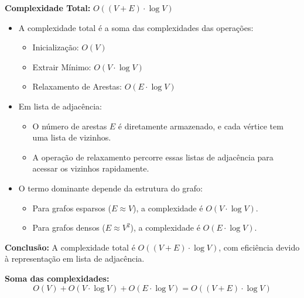 \documentclass[preview]{standalone}
\begin{document}
\begin{center}
\textbf{Complexidade Total:} $O((V + E) \cdot \log V)$
            \begin{itemize}
                \item A complexidade total é a soma das complexidades das operações:
                    \begin{itemize}
                        \item Inicialização: $O(V)$
                        \item Extrair Mínimo: $O(V \cdot \log V)$
                        \item Relaxamento de Arestas: $O(E \cdot \log V)$
                    \end{itemize}
                \item Em lista de adjacência:
                    \begin{itemize}
                        \item O número de arestas $E$ é diretamente armazenado, e cada vértice tem uma lista de vizinhos.
                        \item A operação de relaxamento percorre essas listas de adjacência para acessar os vizinhos rapidamente.
                    \end{itemize}
                \item O termo dominante depende da estrutura do grafo:
                    \begin{itemize}
                        \item Para grafos esparsos ($E \approx V$), a complexidade é $O(V \cdot \log V)$.
                        \item Para grafos densos ($E \approx V^2$), a complexidade é $O(E \cdot \log V)$.
                    \end{itemize}
            \end{itemize}
            
            \textbf{Conclusão:} A complexidade total é $O((V + E) \cdot \log V)$, com eficiência devido à representação em lista de adjacência.
            
            \vspace{1cm}
            
            \textbf{Soma das complexidades:}
            \[
            O(V) + O(V \cdot \log V) + O(E \cdot \log V) = O((V + E) \cdot \log V)
            \]
\end{center}
\end{document}
